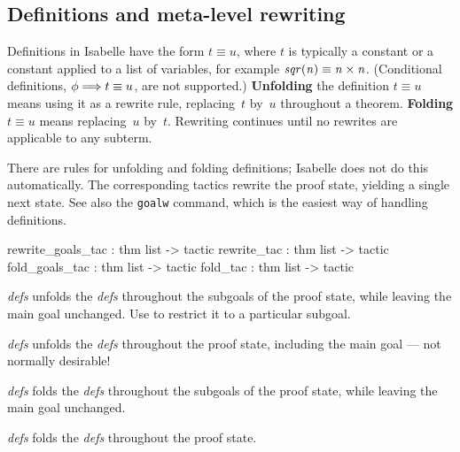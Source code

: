 \subsection{Definitions and meta-level rewriting}

Definitions in Isabelle have the form $t\equiv u$, where $t$ is typically a
constant or a constant applied to a list of variables, for example $\it
sqr(n)\equiv n\times n$.  (Conditional definitions, $\phi\Longrightarrow t\equiv u$,
are not supported.)  {\bf Unfolding} the definition ${t\equiv u}$ means using
it as a rewrite rule, replacing~$t$ by~$u$ throughout a theorem.  {\bf
Folding} $t\equiv u$ means replacing~$u$ by~$t$.  Rewriting continues until
no rewrites are applicable to any subterm.

There are rules for unfolding and folding definitions; Isabelle does not do
this automatically.  The corresponding tactics rewrite the proof state,
yielding a single next state.  See also the {\tt goalw} command, which is the
easiest way of handling definitions.
\begin{ttbox} 
rewrite_goals_tac : thm list -> tactic
rewrite_tac       : thm list -> tactic
fold_goals_tac    : thm list -> tactic
fold_tac          : thm list -> tactic
\end{ttbox}
\begin{ttdescription}
\item[\ttindexbold{rewrite_goals_tac} {\it defs}]  
unfolds the {\it defs} throughout the subgoals of the proof state, while
leaving the main goal unchanged.  Use  to restrict it to a
particular subgoal.

\item[\ttindexbold{rewrite_tac} {\it defs}]  
unfolds the {\it defs} throughout the proof state, including the main goal
--- not normally desirable!

\item[\ttindexbold{fold_goals_tac} {\it defs}]  
folds the {\it defs} throughout the subgoals of the proof state, while
leaving the main goal unchanged.

\item[\ttindexbold{fold_tac} {\it defs}]  
folds the {\it defs} throughout the proof state.
\end{ttdescription}


